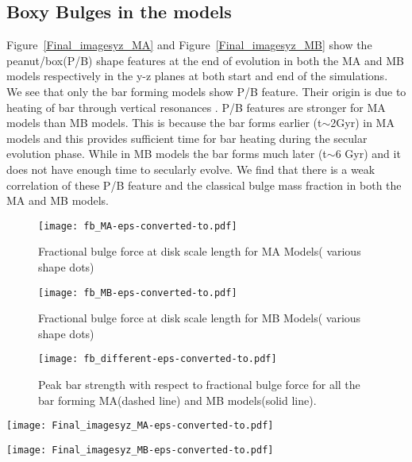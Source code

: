 \documentclass[a4paper,fleqn,usenatbib,useAMS]{mnras}
\begin{document}
\subsection{Boxy Bulges in the models}
Figure~\ref{Final_imagesyz_MA} and Figure~\ref{Final_imagesyz_MB} show the peanut/box(P/B) shape features at the end of evolution in both the MA and MB models respectively in the y-z planes at both start and end of the simulations. We see that only the bar forming models show P/B feature. Their origin is due to heating of bar through vertical resonances \citep{33}. P/B features are stronger for MA models than MB models. This is because the bar forms earlier (t$\sim$2Gyr) in MA models and this provides sufficient time for bar heating during the secular evolution phase. While in MB models the bar forms much later (t$\sim$6 Gyr) and it does not  have enough time to secularly evolve. We find that there is a weak correlation of these P/B feature and the classical bulge mass fraction in both the MA and MB models. 
\begin{figure}
\texttt{[image: fb\_MA-eps-converted-to.pdf]}
\caption{Fractional bulge force at disk scale length for MA Models( various shape dots)}
\label{fb_MA.eps}
\end{figure}
\begin{figure}
\texttt{[image: fb\_MB-eps-converted-to.pdf]}
\caption{ Fractional bulge force at disk scale length for MB Models( various shape dots)}
\label{fig fb_MB.eps}
\end{figure}

\begin{figure}
\texttt{[image: fb\_different-eps-converted-to.pdf]}
\caption{ Peak bar strength with respect to fractional bulge force for all the bar forming MA(dashed line) and MB models(solid line).}
\label{fb_different.eps}
\end{figure}

\begin{figure*}
\texttt{[image: Final\_imagesyz\_MA-eps-converted-to.pdf]}
\caption{First column shows edge on(YZ cross section) of MA models at t=0; second and third column shows 2 different edge on view at t=9.78 Gyr} 
\label{Final_imagesyz_MA}
\end{figure*}

\begin{figure*}
\texttt{[image: Final\_imagesyz\_MB-eps-converted-to.pdf]}
\caption{First column shows edge on(YZ cross section) of MB models at t=0; second and third column shows 2 different edge on view at t=9.78 Gyr} 
\label{Final_imagesyz_MB}
\end{figure*}
\end{document}
